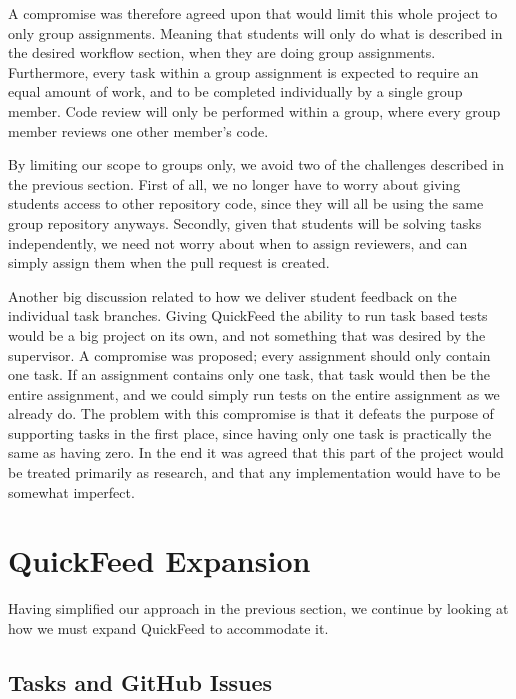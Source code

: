 A compromise was therefore agreed upon that would limit this whole project to only group assignments.
Meaning that students will only do what is described in the desired workflow section, when they are doing group assignments.
Furthermore, every task within a group assignment is expected to require an equal amount of work, and to be completed individually by a single group member.
Code review will only be performed within a group, where every group member reviews one other member's code.

By limiting our scope to groups only, we avoid two of the challenges described in the previous section.
First of all, we no longer have to worry about giving students access to other repository code, since they will all be using the same group repository anyways.
Secondly, given that students will be solving tasks independently, we need not worry about when to assign reviewers, and can simply assign them when the pull request is created.

Another big discussion related to how we deliver student feedback on the individual task branches.
Giving QuickFeed the ability to run task based tests would be a big project on its own, and not something that was desired by the supervisor. 
A compromise was proposed; every assignment should only contain one task.
If an assignment contains only one task, that task would then be the entire assignment, and we could simply run tests on the entire assignment as we already do.
The problem with this compromise is that it defeats the purpose of supporting tasks in the first place, since having only one task is practically the same as having zero.
In the end it was agreed that this part of the project would be treated primarily as research, and that any implementation would have to be somewhat imperfect.


\section{QuickFeed Expansion}

Having simplified our approach in the previous section, we continue by looking at how we must expand QuickFeed to accommodate it.

\subsection{Tasks and GitHub Issues}
\label{sec:tasks_and_github_issues}

